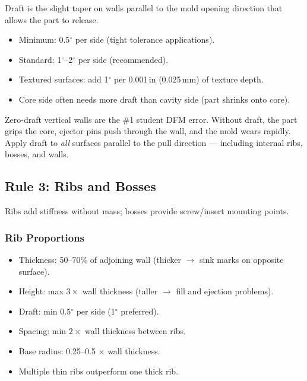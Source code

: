 \documentclass[11pt,letterpaper,twoside,openany]{book}
\providecommand{\ang}[1]{#1\ensuremath{{}^{\circ}}}
\begin{document}
Draft is the slight taper on walls parallel to the mold opening direction that allows the part to release.

\begin{itemize}[nosep,leftmargin=1.5em]
  \item Minimum: \ang{0.5} per side (tight tolerance applications).
  \item Standard: \ang{1}--\ang{2} per side (recommended).
  \item Textured surfaces: add \ang{1} per 0.001\,in (0.025\,mm) of texture depth.
  \item Core side often needs more draft than cavity side (part shrinks onto core).
\end{itemize}

\begin{warningbox}[Zero-Draft = Stuck Parts]
Zero-draft vertical walls are the \#1 student DFM error. Without draft, the part grips the core, ejector pins push through the wall, and the mold wears rapidly. Apply draft to \emph{all} surfaces parallel to the pull direction --- including internal ribs, bosses, and walls.
\end{warningbox}

\subsection{Rule 3: Ribs and Bosses}

Ribs add stiffness without mass; bosses provide screw/insert mounting points.

\subsubsection{Rib Proportions}
\begin{itemize}[nosep,leftmargin=1.5em]
  \item Thickness: 50--70\% of adjoining wall (thicker $\to$ sink marks on opposite surface).
  \item Height: max $3\times$ wall thickness (taller $\to$ fill and ejection problems).
  \item Draft: min \ang{0.5} per side (\ang{1} preferred).
  \item Spacing: min $2\times$ wall thickness between ribs.
  \item Base radius: 0.25--0.5 $\times$ wall thickness.
  \item Multiple thin ribs outperform one thick rib.
\end{itemize}
\end{document}

